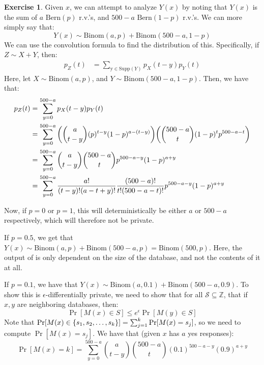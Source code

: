 \documentclass{article}
\theoremstyle{definition}
\newtheorem{exercise}{Exercise}[section]
\begin{document}
\begin{itemize}
\begin{exercise}
Given $x$, we can attempt to analyze $Y(x)$ by noting that $Y(x)$ is the sum of $a$ $\text{Bern}(p)$ r.v.'s, and $500-a$ $\text{Bern}(1-p)$ r.v.'s.
We can more simply say that:
\begin{equation}
Y(x)\sim \text{Binom}(a,p) + \text{Binom}(500 - a,1-p)
\end{equation}
We can use the convolution formula to find the distribution of this.
Specifically, if $Z\sim X+Y$, then:
\begin{align*}
p_Z(t) &= \sum_{\text{y}\in\text{Supp}(Y)}p_X(t-y)p_Y(t)
\end{align*}
Here, let $X\sim\text{Binom}(a,p)$, and $Y\sim\text{Binom}(500-a,1-p)$.
Then, we have that:
\begin{align*}
p_Z(t) &= \sum_{y = 0}^{500-a}p_X(t-y)p_Y(t) \\
& = \sum_{y = 0}^{500-a}\pqty{\binom{a}{t-y}(p)^{t-y}(1-p)^{a-(t-y)}}\pqty{\binom{500-a}{t}(1-p)^tp^{500-a-t}} \\
& = \sum_{y = 0}^{500-a}\binom{a}{t-y}\binom{500-a}{t} p^{500-a-y}(1-p)^{a+y} \\
& = \sum_{y = 0}^{500-a} \frac{a!}{(t-y)!(a-t+y)!}\frac{(500-a)!}{t!(500-a-t)!}p^{500-a-y}(1-p)^{a+y}
\end{align*}

Now, if $p = 0$ or $p = 1$, this will deterministically be either $a$ or $500-a$ respectively, which will therefore not be private.

If $p = 0.5$, we get that $Y(x)\sim\text{Binom}(a,p) + \text{Binom}(500-a,p) = \text{Binom}(500,p)$.
Here, the output of is only dependent on the size of the database, and not the contents of it at all.

If $p = 0.1$, we have that $Y(x)\sim\text{Binom}(a,0.1) + \text{Binom}(500-a,0.9)$.
To show this is $\epsilon$-differentially private, we need to show that for all $\mathcal{S}\subseteq\mathbb{Z}$, that if $x,y$ are neighboring databases, then:
\begin{equation}
\Pr[M(x)\in S] \leq e^\epsilon \Pr[M(y)\in S]
\end{equation}
Note that $\Pr[M(x)\in\Bqty{s_1,s_2,\dots,s_k}] = \sum_{j =1}^k \Pr[M(x) = s_j]$, so we need to compute $\Pr[M(x) = s_j]$.
We have that (given $x$ has $a$ yes responses):
\begin{equation}
\Pr[M(x) = k] = \sum_{y =0}^{500-a}\binom{a}{t-y}\binom{500-a}{t}(0.1)^{500-a-y}(0.9)^{a+y}
\end{equation}

\end{exercise}

\end{itemize}
\end{document}
